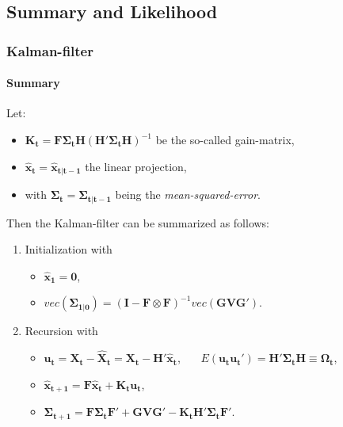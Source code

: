 \documentclass{beamer} %
\begin{document}
\subsection{Summary and Likelihood}
\begin{frame}\frametitle{Kalman-filter}\framesubtitle{Summary}
Let:
\begin{itemize}
\item $\mathbf{K_t}=\mathbf{F}\boldsymbol{\Sigma_{t}} \mathbf{H} \left(\mathbf{H}'\boldsymbol{\Sigma_{t}}\mathbf{H}\right)^{-1}$ be the so-called gain-matrix,
\item $\mathbf{\widehat{x}_t}=\mathbf{\widehat{x}_{t|t-1}}$ the linear projection,
\item with $\boldsymbol{\Sigma_t}=\boldsymbol{\Sigma_{t|t-1}}$ being the \emph{mean-squared-error}.
\end{itemize}
Then the Kalman-filter can be summarized as follows:
\begin{enumerate}
  \item Initialization with
  \begin{itemize}
  \item $\mathbf{\widehat{x}_1} = \mathbf{0}$,
  \item $vec(\boldsymbol{\Sigma_{1|0}}) = (\mathbf{I}-\mathbf{F}
      \otimes \mathbf{F})^{-1} vec(\mathbf{G} \mathbf{V}
      \mathbf{G}')$.
  \end{itemize}
  \item Recursion with
   \begin{itemize}
   \item $\mathbf{u_t} = \mathbf{X_t} -\mathbf{\widehat{X}_t}
       =\mathbf{X_t} - \mathbf{H}' \mathbf{\widehat{x}_t}$,~~~
       $E(\mathbf{u_t}
       \mathbf{u_t'})=\mathbf{H}'\boldsymbol{\Sigma_t}
       \mathbf{H}\equiv \boldsymbol{\Omega_t}$,
    \item $\mathbf{\widehat{x}_{t+1}}=\mathbf{F}
        \mathbf{\widehat{x}_{t}} + \mathbf{K_t} \mathbf{u_t}$,
    \item $\boldsymbol{\Sigma_{t+1}} = \mathbf{F}
        \boldsymbol{\Sigma_{t}} \mathbf{F'} + \mathbf{G} \mathbf{V}
        \mathbf{G}' - \mathbf{K_t} \mathbf{H}'
        \boldsymbol{\Sigma_{t}}\mathbf{F}'$.
    \end{itemize}
\end{enumerate}
\end{frame}
\end{document}
